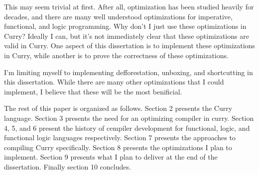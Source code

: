 This may seem trivial at first.  After all, optimization has been studied heavily for decades, and there are many well understood
optimizations for imperative, functional, and logic programming. \cite{}
Why don't I just use these optimizations in Curry?
Ideally I can, but it's not immediately clear that these optimizations are valid in Curry.
One aspect of this dissertation is to implement these optimizations in Curry,
while another is to prove the correctness of these optimizations.

I'm limiting myself to implementing defforestation, unboxing, and shortcutting in this dissertation.
While there are many other optimizations that I could implement, I believe that these will be the most benificial.

The rest of this paper is organized as follows.
Section 2 presents the Curry language. Section 3 presents the need for an optimizing compiler in curry.
Section 4, 5, and 6 present the history of cempiler development for functional, logic, and functional logic languages respectively.
Section 7 presents the approaches to compiling Curry specifically.
Section 8 presents the optimizations I plan to implement.
Section 9 presents what I plan to deliver at the end of the dissertation.
Finally section 10 concludes.
